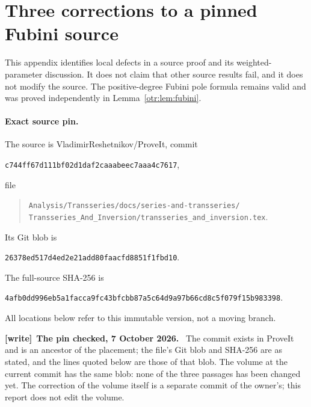 \documentclass[11pt,a4paper]{article}
\theoremstyle{definition}\newtheorem{definition}[theorem]{Definition}
\theoremstyle{remark}\newtheorem{remark}[theorem]{Remark}
\newenvironment{writenote}[1][]{\par\smallskip\begingroup\small
 \noindent\textbf{[write]}\if\relax\detokenize{#1}\relax\else~\textbf{#1.}\fi\ }%
 {\par\endgroup\smallskip}
\begin{document}
\appendix
\section{Three corrections to a pinned Fubini source}
\label{otr:app:corrections}
This appendix identifies local defects in a source proof and its weighted-parameter discussion. It does not claim that other source results fail, and it does not modify the source. The positive-degree Fubini pole formula remains valid and was proved independently in Lemma~\ref{otr:lem:fubini}.

\paragraph{Exact source pin.}
The source is VladimirReshetnikov/ProveIt, commit
\begin{center}\small\texttt{c744ff67d111bf02d1daf2caaabeec7aaa4c7617},\end{center}
file
\begin{quote}\small\nolinkurl{Analysis/Transseries/docs/series-and-transseries/}\\
\nolinkurl{Transseries_And_Inversion/transseries_and_inversion.tex}.\end{quote}
Its Git blob is
\begin{center}\small\texttt{26378ed517d4ed2e21add80faacfd8851f1fbd10}.\end{center}
The full-source SHA-256 is
\begin{center}\small\texttt{4afb0dd996eb5a1facca9fc43bfcbb87a5c64d9a97b66cd8c5f079f15b983398}.\end{center}
All locations below refer to this immutable version, not a moving branch.
\begin{writenote}[The pin checked, 7 October 2026]
The commit exists in ProveIt and is an ancestor of the placement; the file's
Git blob and SHA-256 are as stated, and the lines quoted below are those of
that blob. The volume at the current commit has the same blob: none of the
three passages has been changed yet. The correction of the volume itself is a
separate commit of the owner's; this report does not edit the volume.
\end{writenote}
\end{document}
